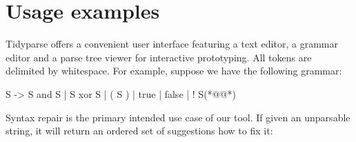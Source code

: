 \documentclass[runningheads]{llncs}
\begin{document}
\section{Usage examples}

Tidyparse offers a convenient user interface featuring a text editor, a grammar editor and a parse tree viewer for interactive prototyping. All tokens are delimited by whitespace. For example, suppose we have the following grammar:

\begin{wholetidyinput}
  S -> S and S | S xor S | ( S ) | true | false | ! S(*@\caret{ }@*)
\end{wholetidyinput}

\noindent Syntax repair is the primary intended use case of our tool. If given an unparsable string, it will return an ordered set of suggestions how to fix it:
\end{document}
